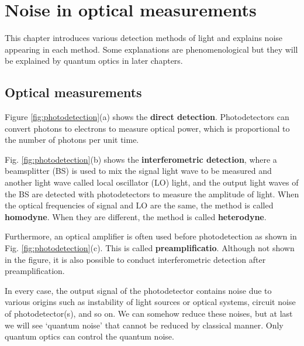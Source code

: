 \documentclass{book}
\begin{document}



\chapter{Noise in optical measurements}
This chapter introduces various detection methods of light and explains noise appearing in each method. Some explanations are phenomenological but they will be explained by quantum optics in later chapters.

\section{Optical measurements}
Figure \ref{fig:photodetection}(a) shows the \textbf{direct detection}. Photodetectors can convert photons to electrons to measure optical power, which is proportional to the number of photons per unit time. 

Fig. \ref{fig:photodetection}(b) shows the \textbf{interferometric detection}, where a beamsplitter (BS) is used to mix the signal light wave to be measured and another light wave called local oscillator (LO) light, and the output light waves of the BS are detected with photodetectors to measure the amplitude of light. When the optical frequencies of signal and LO are the same, the method is called \textbf{homodyne}. When they are different, the method is called \textbf{heterodyne}.

Furthermore, an optical amplifier is often used before photodetection as shown in Fig. \ref{fig:photodetection}(c). This is called \textbf{preamplificatio}. Although not shown in the figure, it is also possible to conduct interferometric detection after preamplification. 

In every case, the output signal of the photodetector contains noise due to various origins such as instability of light sources or optical systems, circuit noise of photodetector(s), and so on. We can somehow reduce these noises, but at last we will see `quantum noise' that cannot be reduced by classical manner. Only quantum optics can control the quantum noise.
\end{document}
